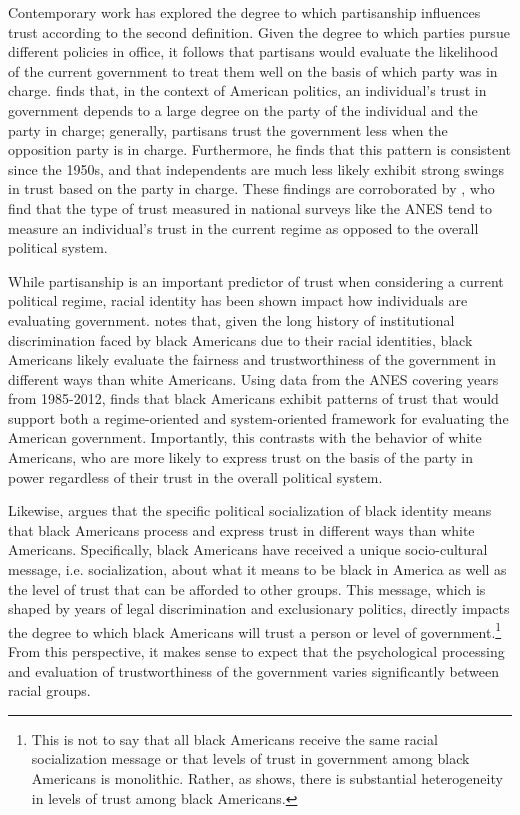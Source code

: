 \documentclass[12pt, letterpaper]{article}
\begin{document}
Contemporary work has explored the degree to which partisanship influences trust according to the second definition. Given the degree to which parties pursue different policies in office, it follows that partisans would evaluate the likelihood of the current government to treat them well on the basis of which party was in charge.  \citet{keele2005} finds that, in the context of American politics, an individual's trust in government depends to a large degree on the party of the individual and the party in charge; generally, partisans trust the government less when the opposition party is in charge. Furthermore, he finds that this pattern is consistent since the 1950s, and that independents are much less likely exhibit strong swings in trust based on the party in charge. These findings are corroborated by \citet{cook2005}, who find that the type of trust measured in national surveys like the ANES tend to measure an individual's trust in the current regime as opposed to the overall political system. 

While partisanship is an important predictor of trust when considering a current political regime, racial identity has been shown impact how individuals are evaluating government. \citet{wilkes2015} notes that, given the long history of institutional discrimination faced by black Americans due to their racial identities, black Americans likely evaluate the fairness and trustworthiness of the government in different ways than white Americans. Using data from the ANES covering years from 1985-2012, \citeauthor{wilkes2015} finds that black Americans exhibit patterns of trust that would support both a regime-oriented and system-oriented framework for evaluating the American government. Importantly, this contrasts with the behavior of white Americans, who are more likely to express trust on the basis of the party in power regardless of their trust in the overall political system.

Likewise, \citet{nunnally2012} argues that the specific political socialization of black identity means that black Americans process and express trust in different ways than white Americans. Specifically, black Americans have received a unique socio-cultural message, i.e. socialization, about what it means to be black in America as well as the level of trust that can be afforded to other groups. This message, which is shaped by years of legal discrimination and exclusionary politics, directly impacts the degree to which black Americans will trust a person or level of government.\footnote{This is not to say that all black Americans receive the same racial socialization message or that levels of trust in government among black Americans is monolithic. Rather, as \citeauthor{nunnally2012} shows, there is substantial heterogeneity in levels of trust among black Americans.} From this perspective, it makes sense to expect that the psychological processing and evaluation of trustworthiness of the government varies significantly between racial groups.
\end{document}
